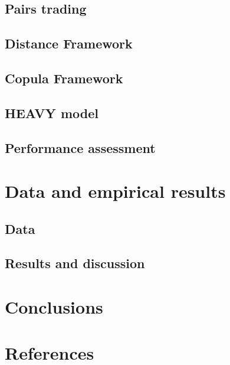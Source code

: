 \documentclass[review]{elsarticle}
\begin{document}
\subsection{Pairs trading} %

\subsection{Distance Framework} %

\subsection{Copula Framework} %

\subsection{HEAVY model} %

\subsection{Performance assessment} 

\section{Data and empirical results}

\subsection{Data} %

\subsection{Results and discussion} 

\section{Conclusions}

\section*{References}


\end{document}
